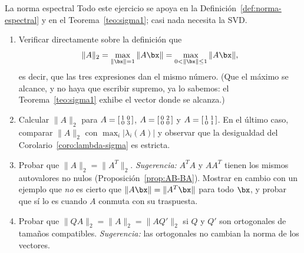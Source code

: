 \begin{entrega}{La norma espectral}\label{ent:norma-espectral}
Todo este ejercicio se apoya en la Definición~\ref{def:norma-espectral} y en
el Teorema~\ref{teo:sigma1}; casi nada necesita la SVD.

\begin{enumerate}[label=\textbf{(\alph*)},itemsep=3pt,topsep=4pt]
\item Verificar directamente sobre la definición que
\[
\|A\|_2=\max_{\|\bx\|=1}\|A\bx\|=\max_{0<\|\bx\|\le1}\|A\bx\| ,
\]
es decir, que las tres expresiones dan el mismo número. (Que el máximo se
alcance, y no haya que escribir supremo, ya lo sabemos: el
Teorema~\ref{teo:sigma1} exhibe el vector donde se alcanza.)

\item Calcular $\|A\|_2$ para
$A=\begin{bsmallmatrix}1&0\\ 0&3\end{bsmallmatrix}$,
$A=\begin{bsmallmatrix}0&2\\ 0&0\end{bsmallmatrix}$ y
$A=\begin{bsmallmatrix}1&1\\ 0&1\end{bsmallmatrix}$. En el último caso,
comparar $\|A\|_2$ con $\max_i|\lambda_i(A)|$ y observar que la desigualdad
del Corolario~\ref{coro:lambda-sigma} es estricta.

\item Probar que $\|A\|_2=\|A^T\|_2$. \emph{Sugerencia:} $A^TA$ y $AA^T$
tienen los mismos autovalores no nulos
(Proposición~\ref{prop:AB-BA}). Mostrar en cambio con un ejemplo que
\emph{no} es cierto que $\|A\bx\|=\|A^T\bx\|$ para todo $\bx$, y probar que
sí lo es cuando $A$ conmuta con su traspuesta.

\item Probar que $\|QA\|_2=\|A\|_2=\|AQ'\|_2$ si $Q$ y $Q'$ son ortogonales
de tamaños compatibles. \emph{Sugerencia:} las ortogonales no cambian la
norma de los vectores.


\end{enumerate}
\end{entrega}

